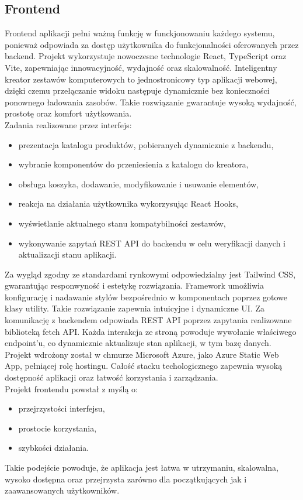 \documentclass[a4paper,twoside,12pt]{book}
\begin{document}
\subsection{Frontend}
Frontend aplikacji pełni ważną funkcję w funckjonowaniu każdego systemu, ponieważ odpowiada za dostęp użytkownika do funkcjonalności oferowanych przez backend. Projekt wykorzystuje nowoczesne technologie React, TypeScript oraz Vite, zapewniając innowacyjność, wydajność oraz skalowalność.
Inteligentny kreator zestawów komputerowych to jednostronicowy typ aplikacji webowej, dzięki czemu przełączanie widoku następuje dynamicznie bez konieczności ponownego ładowania zasobów. Takie rozwiązanie gwarantuje wysoką wydajność, prostotę oraz komfort użytkowania.
\\ Zadania realizowane przez interfejs:
\begin{itemize}
    \item prezentacja katalogu produktów, pobieranych dynamicznie z backendu,
    \item wybranie komponentów do przeniesienia z katalogu do kreatora,
    \item obsługa koszyka, dodawanie, modyfikowanie i usuwanie elementów,
    \item reakcja na działania użytkownika wykorzysując React Hooks,
    \item wyświetlanie aktualnego stanu kompatybilności zestawów,
    \item wykonywanie zapytań REST API do backendu w celu weryfikacji danych i aktualizacji stanu aplikacji.
\end{itemize}

Za wygląd zgodny ze standardami rynkowymi odpowiedzialny jest Tailwind CSS, gwarantując responwyność i estetykę rozwiązania. Framework umożliwia konfigurację i nadawanie stylów bezpośrednio w komponentach poprzez gotowe klasy utility. Takie rozwiązanie zapewnia intuicyjne i dynamiczne UI. Za komunikację z backendem odpowiada REST API poprzez zapytania realizowane biblioteką fetch API. Każda interakcja ze stroną powoduje wywołanie właściwego endpoint'u, co dynamicznie aktualizuje stan aplikacji, w tym bazę danych. Projekt wdrożony został w chmurze Microsoft Azure, jako Azure Static Web App, pełniącej rolę hostingu. Całość stacku techologicznego zapewnia wysoką dostępność aplikacji oraz łatwość korzystania i zarządzania.\\
Projekt frontendu powstał z myślą o:
\begin{itemize}
    \item przejrzystości interfejsu, 
    \item prostocie korzystania,
    \item szybkości działania.
\end{itemize}  
Takie podejście powoduje, że aplikacja jest łatwa w utrzymaniu, skalowalna, wysoko dostępna oraz przejrzysta zarówno dla początkujących jak i zaawansowanych użytkowników.
\end{document}
